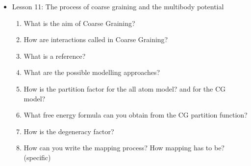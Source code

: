 {\begin{itemize}
\begin{enumerate}
        \item what happens to a liquid with high Temperatures? and with low temperatures? What happens to the partition function?
        \item How is entropy while varying the temperature?
        \item What is phase transition?
        \item What is the order of a phase transition? What happens at the critical point
        \item How is correlation changing outside the CP and in the CP?
        \item When is a system self-similar? what does it mean? To how many parameters depend the correlation length? 
        \item How would you write the hamiltonian of the Ising model by making use of the renormalisation group? And the partition function?
        \item What is the meaning of defocusing? How can defocusing be done?
        \item What is a projection operator?
        \item How are the partition function and the free energy after defocusing?
        \item What happens when you defocus your system in terms of entropy? And what free energy do you obtain?
        \item What happens to a correlation function at each step if not on a critical point? what if on a critical point?
    \end{enumerate}
    \item Lesson 11: The process of coarse graining and the multibody potential
    \begin{enumerate}
        \item What is the aim of Coarse Graining?
        \item How are interactions called in Coarse Graining?
        \item What is a reference?
        \item What are the possible modelling approaches?
        \item How is the partition factor for the all atom model? and for the CG model?
        \item What free energy formula can you obtain from the CG partition function?
        \item How is the degeneracy factor?
        \item How can you write the mapping process? How mapping has to be? (specific)

\end{enumerate}
\end{itemize}}
